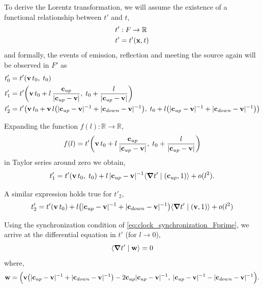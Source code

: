 \documentclass[12pt]{article}
\newcommand{\ip}[2]{\langle #1 \mid #2 \rangle}
\begin{document}
To derive the Lorentz transformation, we will assume the existence of a functional
relationship between $t'$ and $t$,
\begin{align}
  t' &: F \rightarrow \mathbb{R} \\
  t' &= t'(\vb{x}, t)
\end{align}
and formally, the events of emission, reflection and meeting the source again will be observed
in $F'$ as
\begin{align}
  t'_0 &= t'(\vb{v}\, t_0,\; t_0) \\
  t'_1 &= t'\!\left(
    \vb{v}\, t_0 + l\,\frac{\vb{c}_{up}}{|\vb{c}_{up} - \vb{v}|},\;
    t_0 + \frac{l}{|\vb{c}_{up} - \vb{v}|}
  \right) \\
  t'_2 &= t'\!\left(
    \vb{v}\, t_0 + \vb{v}\, l
      \bigl(|\vb{c}_{up} - \vb{v}|^{-1} + |\vb{c}_{down} - \vb{v}|^{-1}\bigr),\;
    t_0 + l\bigl(|\vb{c}_{up} - \vb{v}|^{-1} + |\vb{c}_{down} - \vb{v}|^{-1}\bigr)
  \right)
\end{align}

Expanding the function $f(l): \mathbb{R} \rightarrow \mathbb{R}$,
\begin{equation}
  f(l) = t'\!\left(
    \vb{v}\, t_0 + l\,\frac{\vb{c}_{up}}{|\vb{c}_{up} - \vb{v}|},\;
    t_0 + \frac{l}{|\vb{c}_{up} - \vb{v}|}
  \right)
\end{equation}
in Taylor series around zero we obtain,
\begin{equation}
  t'_1 = t'(\vb{v}\, t_0,\; t_0)
    + l\,|\vb{c}_{up} - \vb{v}|^{-1}
      \ip{\grad t'}{(\vb{c}_{up}, 1)} + o(l^2).
\end{equation}

A similar expression holds true for $t'_2$,
\begin{equation}
  t'_2 = t'(\vb{v}\, t_0)
    + l\bigl(|\vb{c}_{up} - \vb{v}|^{-1} + |\vb{c}_{down} - \vb{v}|^{-1}\bigr)
      \ip{\grad t'}{(\vb{v}, 1)} + o(l^2)
\end{equation}

Using the synchronization condition of \eqref{eq:clock_synchronization_Fprime}, we arrive at
the differential equation in $t'$ (for $l \to 0$),
\begin{equation}
  \ip{\grad t'}{\vb{w}} = 0
\end{equation}
where,
\begin{equation}
  \vb{w} = \Bigl(
    \vb{v}\bigl(|\vb{c}_{up} - \vb{v}|^{-1} + |\vb{c}_{down} - \vb{v}|^{-1}\bigr)
    - 2\vb{c}_{up}|\vb{c}_{up} - \vb{v}|^{-1},\;
    |\vb{c}_{up} - \vb{v}|^{-1} - |\vb{c}_{down} - \vb{v}|^{-1}
  \Bigr).
\end{equation}
\end{document}
